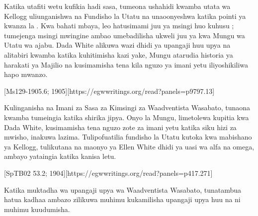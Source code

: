 


Katika utafiti wetu kufikia hadi sasa, tumeona ushahidi kwamba utata wa Kellogg uliunganishwa na Fundisho la Utatu na  unaoonyeshwa katika pointi ya kwanza la . Kwa bahati mbaya, leo hatusimami juu ya msingi huo kuhusu ; tumejenga msingi mwingine ambao umebadilisha ukweli juu ya  kwa Mungu wa Utatu wa ajabu. Dada White alikuwa wazi dhidi ya upangaji huu upya na alitabiri kwamba katika kuhitimisha kazi yake, Mungu atarudia historia ya harakati ya Majilio na kusimamisha tena kila nguzo ya imani yetu iliyoshikiliwa hapo mwanzo.


[Ms129-1905.6; 1905][https://egwwritings.org/read?panels=p9797.13]


Kulinganisha  na Imani za Sasa za Kimsingi za Waadventista Wasabato, tunaona kwamba tumeingia katika shirika jipya. Onyo la Mungu, limetolewa kupitia kwa Dada White, kusimamisha tena nguzo zote za imani yetu katika siku hizi za mwisho, inakuwa lazima. Tulipofuatilia fundisho la Utatu kutoka kwa mabishano ya Kellogg, tulikutana na maonyo ya Ellen White dhidi ya uasi wa alfa na omega, ambayo yataingia katika kanisa letu.


[SpTB02 53.2; 1904][https://egwwritings.org/read?panels=p417.271]


Katika muktadha wa upangaji upya wa Waadventista Wasabato, tunatambua hatua kadhaa ambazo zilikuwa muhimu kukamilisha upangaji upya huu na ni muhimu kuudumisha.


